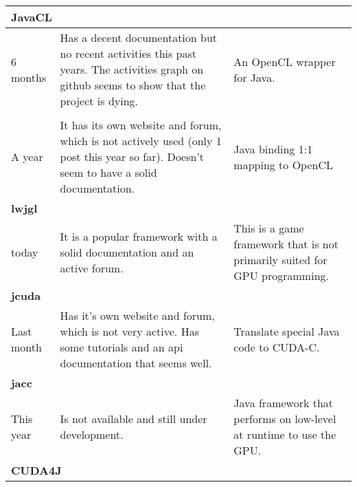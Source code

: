 \begin{longtable}{ | p{} | p{} | p{} | }
  \hline \hline
  
  \multicolumn{3}{|l|}{\textbf{JavaCL}} \\

  \hline

  6 months &
  Has a decent documentation but no recent activities this past years. The activities graph on github seems to show 
  that the project is dying. &
  An OpenCL wrapper for Java. \\
  
  \hline \newpage \hline
  
  \multicolumn{3}{|l|}{\textbf{jocl}} \\

  \hline

  A year &
  It has its own website and forum, which is not actively used (only 1 post this year so far). Doesn't seem
  to have a solid documentation. &
  Java binding 1:1 mapping to OpenCL \\
  
  \hline \hline
  
  \multicolumn{3}{|l|}{\textbf{lwjgl}} \\

  \hline

  today &
  It is a popular framework with a solid documentation and an active forum. &
  This is a game framework that is not primarily suited for GPU programming. \\
  
  \hline \hline
  
  \multicolumn{3}{|l|}{\textbf{jcuda}} \\

  \hline

  Last month &
  Has it's own website and forum, which is not very active. Has some tutorials and an api documentation that seems well. &
  Translate special Java code to CUDA-C. \\
  
  \hline \hline
  
  \multicolumn{3}{|l|}{\textbf{jacc}} \\

  \hline

  This year &
  Is not available and still under development. &
  Java framework that performs on low-level at runtime to use the GPU. \\
  
  \hline \hline
  
  \multicolumn{3}{|l|}{\textbf{CUDA4J}} \\


\end{longtable}
